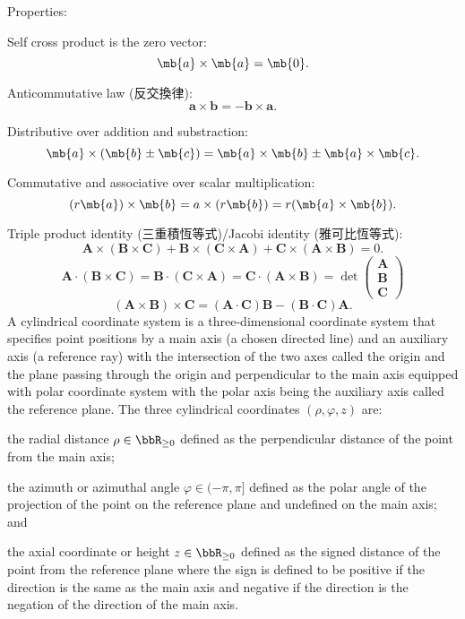 \documentclass[a4paper,12pt]{report}
\begin{document}
Properties:
\bit
\item Self cross product is the zero vector:
\[\mb{a}\times\mb{a}=\mb{0}.\]
\item Anticommutative law (反交換律):
\[\mathbf{a}\times\mathbf{b}=-\mathbf{b}\times\mathbf{a}.\]
\item Distributive over addition and substraction:
\[\mb{a}\times(\mb{b}\pm\mb{c})=\mb{a}\times\mb{b}\pm\mb{a}\times\mb{c}.\]
\item Commutative and associative over scalar multiplication:
\[(r\mb{a})\times\mb{b}=a\times(r\mb{b})=r(\mb{a}\times\mb{b}).\]
\item Triple product identity (三重積恆等式)/Jacobi identity (雅可比恆等式):
\[\mathbf{A}\times(\mathbf{B}\times\mathbf{C})+\mathbf{B}\times(\mathbf{C}\times\mathbf{A})+\mathbf{C}\times(\mathbf{A}\times\mathbf{B})=0.\]
\[\mathbf{A}\cdot(\mathbf{B}\times\mathbf{C})=\mathbf{B}\cdot(\mathbf{C}\times\mathbf{A})=\mathbf{C}\cdot(\mathbf{A}\times\mathbf{B})=\det\begin{pmatrix}\mathbf{A}\\\mathbf{B}\\\mathbf{C}\end{pmatrix}\]
\[(\mathbf{A}\times\mathbf{B})\times\mathbf{C}=(\mathbf{A}\cdot\mathbf{C})\mathbf{B}-(\mathbf{B}\cdot\mathbf{C})\mathbf{A}.\]
\eit
{}
A cylindrical coordinate system is a three-dimensional coordinate system that specifies point positions by a main axis (a chosen directed line) and an auxiliary axis (a reference ray) with the intersection of the two axes called the origin and the plane passing through the origin and perpendicular to the main axis equipped with polar coordinate system with the polar axis being the auxiliary axis called the reference plane. The three cylindrical coordinates $(\rho,\varphi,z)$ are:
\bit
\item the radial distance $\rho\in\bbR_{\geq 0}$ defined as the perpendicular distance of the point from the main axis;
\item the azimuth or azimuthal angle $\varphi\in(-\pi,\pi]$ defined as the polar angle of the projection of the point on the reference plane and undefined on the main axis; and
\item the axial coordinate or height $z\in\bbR_{\geq 0}$ defined as the signed distance of the point from the reference plane where the sign is defined to be positive if the direction is the same as the main axis and negative if the direction is the negation of the direction of the main axis.
\end{document}
